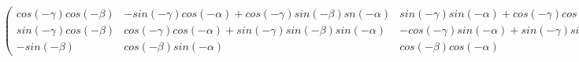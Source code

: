 \documentclass[border=1cm,varwidth=\maxdimen]{standalone}
\begin{document}
		$
		\begin{pmatrix}
			cos(-\gamma)cos(-\beta) & -sin(-\gamma)cos(-\alpha)+cos(-\gamma)sin(-\beta)sn(-\alpha) & sin(-\gamma)sin(-\alpha)+cos(-\gamma)cos(-\alpha)sin(-\beta)\\
			sin(-\gamma)cos(-\beta) & cos(-\gamma)cos(-\alpha)+sin(-\gamma)sin(-\beta)sin(-\alpha) & -cos(-\gamma)sin(-\alpha)+sin(-\gamma)sin(-\beta)cos(-\alpha)\\
			-sin(-\beta) & cos(-\beta)sin(-\alpha) & cos(-\beta)cos(-\alpha)
		\end{pmatrix}
		\cdot
		\begin{pmatrix}
			{v}_{Drohne;x}''\\
			{v}_{Drohne;y}''\\
			{v}_{Drohne;z}''
		\end{pmatrix}
		=
		\begin{pmatrix}
			{v}_{Drohne;x}\\
			{v}_{Drohne;y}\\
			{v}_{Drohne;z}
		\end{pmatrix}
		$
\end{document}
